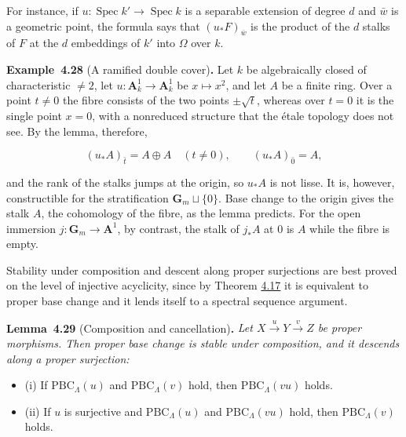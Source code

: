 \documentclass[11pt]{article}
\newenvironment{bpstatement}[2]{\par\addvspace{0.6\baselineskip}\noindent\textbf{#1}#2\textbf{.}\enspace\ignorespaces}
  {\par\addvspace{0.4\baselineskip}}
\newenvironment{bpstatementit}[2]{\begin{bpstatement}{#1}{#2}\itshape\ignorespaces}{\end{bpstatement}}
\begin{document}
\label{bp366}%
For instance, if \(u:\operatorname{Spec}k'\to\operatorname{Spec}k\) is a separable extension of degree \(d\) and \(\bar w\) is a geometric point, the formula says that \((u_*F)_{\bar w}\) is the product of the \(d\) stalks of \(F\) at the \(d\) embeddings of \(k'\) into \(\Omega\) over \(k\).

\label{bp367}%
\begin{bpstatement}{Example~4.28}{ (A ramified double cover)}
Let \(k\) be algebraically closed of characteristic \(\neq2\), let \(u:\mathbf A^1_k\to\mathbf A^1_k\) be \(x\mapsto x^2\), and let \(A\) be a finite ring. Over a point \(t\neq0\) the fibre consists of the two points \(\pm\sqrt t\), whereas over \(t=0\) it is the single point \(x=0\), with a nonreduced structure that the étale topology does not see. By the lemma, therefore,

\[
(u_*A)_{\bar t}=A\oplus A\quad(t\neq0),\qquad (u_*A)_{\bar0}=A,
\]

and the rank of the stalks jumps at the origin, so \(u_*A\) is not lisse. It is, however, constructible for the stratification \(\mathbf G_m\sqcup\{0\}\). Base change to the origin gives the stalk \(A\), the cohomology of the fibre, as the lemma predicts. For the open immersion \(j:\mathbf G_m\to\mathbf A^1\), by contrast, the stalk of \(j_*A\) at \(0\) is \(A\) while the fibre is empty.
\end{bpstatement}

\label{bp368}%
Stability under composition and descent along proper surjections are best proved on the level of injective acyclicity, since by Theorem \hyperref[bp329]{4.17} it is equivalent to proper base change and it lends itself to a spectral sequence argument.

\label{bp369}%
\begin{bpstatementit}{Lemma~4.29}{ (Composition and cancellation)}
Let \(X\xrightarrow{u}Y\xrightarrow{v}Z\) be proper morphisms. Then proper base change is stable under composition, and it descends along a proper surjection:

\begin{itemize}
\item (i) If \(\mathrm{PBC}_\Lambda(u)\) and \(\mathrm{PBC}_\Lambda(v)\) hold, then \(\mathrm{PBC}_\Lambda(vu)\) holds.
\item (ii) If \(u\) is surjective and \(\mathrm{PBC}_\Lambda(u)\) and \(\mathrm{PBC}_\Lambda(vu)\) hold, then \(\mathrm{PBC}_\Lambda(v)\) holds.
\end{itemize}
\end{bpstatementit}
\end{document}
